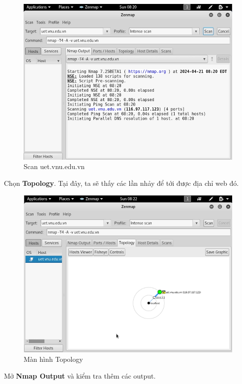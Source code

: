 \begin{figure}[!htb]
    \centering
    \includegraphics[width=0.85\linewidth]{figure//chapter5//lab5_1/scan-site.png}
    \caption{Scan uet.vnu.edu.vn}
    \label{fig:enter-label}
\end{figure}

 Chọn \textbf{Topology}. Tại đây, ta sẽ thấy các lần nhảy để tới được địa chỉ web đó.

\begin{figure}[!htb]
    \centering
    \includegraphics[width=0.85\linewidth]{figure//chapter5//lab5_1/topology.png}
    \caption{Màn hình Topology}
    \label{fig:enter-label}
\end{figure}

\newpage

 Mở \textbf{Nmap Output} và kiểm tra thêm các output.


